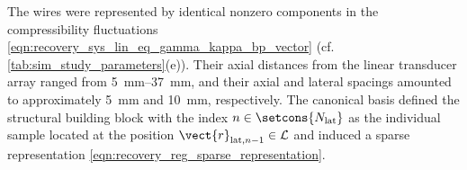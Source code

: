 The wires were represented by
identical nonzero components in
the compressibility fluctuations
\eqref{eqn:recovery_sys_lin_eq_gamma_kappa_bp_vector}
(cf. \cref{tab:sim_study_parameters}(e)).
Their axial distances from
the linear transducer array ranged from
\SIrange{5}{37}{\milli\meter}, and
their axial and
lateral spacings amounted to
approximately \SI{5}{\milli\meter} and
\SI{10}{\milli\meter},
respectively.
The canonical basis defined
the structural building block with
the index
$n \in \setcons{ N_{\text{lat}} }$ as
the individual sample located at
the position
$\vect{r}_{ \text{lat}, n - 1 } \in \mathcal{L}$ and induced
a sparse representation
\eqref{eqn:recovery_reg_sparse_representation}.
